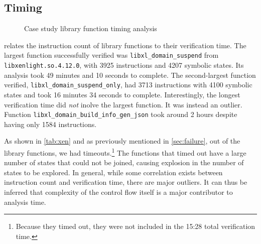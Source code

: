 \subsection{Timing}\label{sec:timing}
\begin{figure}
  \centering
  \caption{Case study library function timing analysis}\label{fig:distr}
\end{figure}
 relates the instruction count of library functions to their verification time.
The largest function successfully verified was \lstinline|libxl_domain_suspend| from \lstinline|libxenlight.so.4.12.0|, with \num{3925} instructions and \num{4207} symbolic states.
Its analysis took \num{49} minutes and \num{10} seconds to complete.
The second-largest function verified, \lstinline|libxl_domain_suspend_only|, had \num{3713} instructions with \num{4100} symbolic states and took \num{16} minutes \num{34} seconds to complete.
Interestingly, the longest verification time did \emph{not} inolve the largest function.
It was instead an outlier.
Function \lstinline|libxl_domain_build_info_gen_json| took around \num{2} hours despite having only \num{1584} instructions.

As shown in \cref{tab:xen} and as previously mentioned in \cref{sec:failure}, out of the  library functions, we had  timeouts.\footnote{%
  Because they timed out, they were not included in the 15:28 total verification time.%
}
The functions that timed out have a large number of states that could not be joined, causing explosion in the number of states to be explored.
In general, while some correlation exists between instruction count and verification time, there are major outliers.
It can thus be inferred that complexity of the control flow itself is a major contributor to analysis time.

